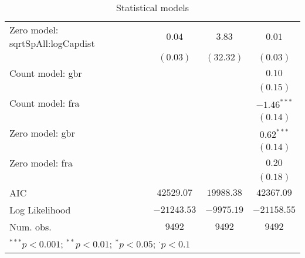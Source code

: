 \begin{table}
\begin{center}
{\begin{tabular}{l c c c}
Zero model: sqrtSpAll:logCapdist  & $0.04$          & $3.83$        & $0.01$        \\
                                  & $(0.03)$        & $(32.32)$     & $(0.03)$      \\
Count model: gbr                  &                 &               & $0.10$        \\
                                  &                 &               & $(0.15)$      \\
Count model: fra                  &                 &               & $-1.46^{***}$ \\
                                  &                 &               & $(0.14)$      \\
Zero model: gbr                   &                 &               & $0.62^{***}$  \\
                                  &                 &               & $(0.14)$      \\
Zero model: fra                   &                 &               & $0.20$        \\
                                  &                 &               & $(0.18)$      \\
\midrule
AIC                               & $42529.07$      & $19988.38$    & $42367.09$    \\
Log Likelihood                    & $-21243.53$     & $-9975.19$    & $-21158.55$   \\
Num. obs.                         & $9492$          & $9492$        & $9492$        \\
\bottomrule
\multicolumn{4}{l}{\scriptsize{$^{***}p<0.001$; $^{**}p<0.01$; $^{*}p<0.05$; $^{\cdot}p<0.1$}}
\end{tabular}
}
\caption{Statistical models}
\label{zinb}
\end{center}
\end{table}
